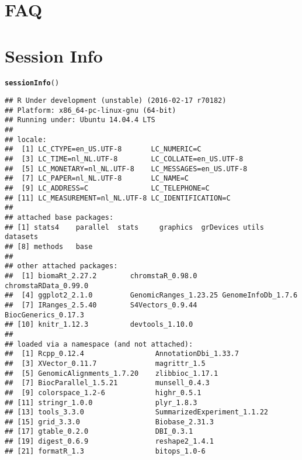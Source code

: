 \documentclass[11pt]{article}\usepackage[]{graphicx}\usepackage[]{color}
\makeatletter
\newcommand{\hlstd}[1]{\textcolor[rgb]{0.345,0.345,0.345}{#1}}%
\newcommand{\hlkwd}[1]{\textcolor[rgb]{0.737,0.353,0.396}{\textbf{#1}}}%
\newenvironment{kframe}{%
 \def\at@end@of@kframe{}%
 \ifinner\ifhmode%
  \def\at@end@of@kframe{\end{minipage}}%
  \begin{minipage}{\columnwidth}%
 \fi\fi%
 \def\FrameCommand##1{\hskip\@totalleftmargin \hskip-\fboxsep
 \colorbox{shadecolor}{##1}\hskip-\fboxsep
     \hskip-\linewidth \hskip-\@totalleftmargin \hskip\columnwidth}%
 \MakeFramed {\advance\hsize-\width
   \@totalleftmargin\z@ \linewidth\hsize
   \@setminipage}}%
 {\par\unskip\endMakeFramed%
 \at@end@of@kframe}
\newenvironment{knitrout}{}{} %
\makeatother
\begin{document}
\begin{scriptsize}
\end{scriptsize}

\section{\label{sec:faq}FAQ}

\section{Session Info}
\begin{scriptsize}
\begin{knitrout}
\color{fgcolor}\begin{kframe}
\begin{alltt}
\hlkwd{sessionInfo}\hlstd{()}
\end{alltt}
\begin{verbatim}
## R Under development (unstable) (2016-02-17 r70182)
## Platform: x86_64-pc-linux-gnu (64-bit)
## Running under: Ubuntu 14.04.4 LTS
## 
## locale:
##  [1] LC_CTYPE=en_US.UTF-8       LC_NUMERIC=C              
##  [3] LC_TIME=nl_NL.UTF-8        LC_COLLATE=en_US.UTF-8    
##  [5] LC_MONETARY=nl_NL.UTF-8    LC_MESSAGES=en_US.UTF-8   
##  [7] LC_PAPER=nl_NL.UTF-8       LC_NAME=C                 
##  [9] LC_ADDRESS=C               LC_TELEPHONE=C            
## [11] LC_MEASUREMENT=nl_NL.UTF-8 LC_IDENTIFICATION=C       
## 
## attached base packages:
## [1] stats4    parallel  stats     graphics  grDevices utils     datasets 
## [8] methods   base     
## 
## other attached packages:
##  [1] biomaRt_2.27.2        chromstaR_0.98.0      chromstaRData_0.99.0 
##  [4] ggplot2_2.1.0         GenomicRanges_1.23.25 GenomeInfoDb_1.7.6   
##  [7] IRanges_2.5.40        S4Vectors_0.9.44      BiocGenerics_0.17.3  
## [10] knitr_1.12.3          devtools_1.10.0      
## 
## loaded via a namespace (and not attached):
##  [1] Rcpp_0.12.4                 AnnotationDbi_1.33.7       
##  [3] XVector_0.11.7              magrittr_1.5               
##  [5] GenomicAlignments_1.7.20    zlibbioc_1.17.1            
##  [7] BiocParallel_1.5.21         munsell_0.4.3              
##  [9] colorspace_1.2-6            highr_0.5.1                
## [11] stringr_1.0.0               plyr_1.8.3                 
## [13] tools_3.3.0                 SummarizedExperiment_1.1.22
## [15] grid_3.3.0                  Biobase_2.31.3             
## [17] gtable_0.2.0                DBI_0.3.1                  
## [19] digest_0.6.9                reshape2_1.4.1             
## [21] formatR_1.3                 bitops_1.0-6               

\end{verbatim}
\end{kframe}
\end{knitrout}
\end{scriptsize}
\end{document}
